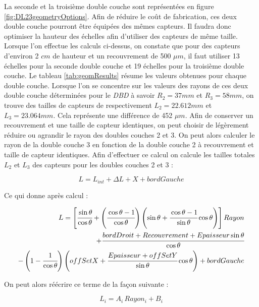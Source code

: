   \medskip
   
   La seconde et la troisi\`eme double couche sont repr\'esent\'ees en figure \ref{fig:DL23geometryOptions}. Afin de r\'eduire le co\^ut de fabrication, ces deux double couche pourront \^etre \'equip\'ees des m\^emes capteurs. Il faudra donc optimiser la hauteur des \'echelles afin d'utiliser des capteurs de m\^eme taille. Lorsque l'on effectue les calculs ci-dessus, on constate que pour des capteurs d'environ 2 $cm$ de hauteur et un recouvrement de 500 $\mu m$, il faut utiliser 13 \'echelles pour la seconde double couche et 19 \'echelles pour la troisi\`eme double couche. Le tableau \ref{tab:geomResults} r\'esume les valeurs obtenues pour chaque double couche. Lorsque l'on se concentre sur les valeurs des rayons de ces deux double couche d\'etermin\'ees pour le \textit{DBD} \`a savoir $R_2 = 37 mm$ et $R_3 = 58 mm$, on trouve des tailles de capteurs de respectivement $L_2 = 22.612 mm$ et $L_3 = 23.064 mm$. Cela repr\'esente une diff\'erence de 452 $\mu m$. Afin de conserver un recouvrement et une taille de capteur identiques, on peut choisir de l\'eg\`erement r\'eduire ou agrandir le rayon des doubles couches 2 et 3. On peut alors calculer le rayon de la double couche 3 en fonction de la double couche 2 \`a recouvrement et taille de capteur identiques. Afin d'effectuer ce calcul on calcule les tailles totales $L_2$ et $L_3$ des capteurs pour les doubles couches 2 et 3 :
  
  \begin{equation}
   L = L_{int} + \Delta L + X + bordGauche
  \end{equation}

  Ce qui donne apr\`es calcul :
  
  \begin{align}
   L = \left[ \cfrac{\sin{\theta}}{\cos{\theta}}  + \left( \cfrac{\cos{\theta} - 1}{\cos{\theta}} \right) \left( \sin{\theta} + \cfrac{\cos{\theta} - 1}{\sin{\theta}} \cos{\theta} \right) \right] Rayon \\ \nonumber
   + \cfrac{bordDroit + Recouvrement + Epaisseur \sin{\theta}}{\cos{\theta}} \\ \nonumber
   - \left( 1 - \cfrac{1}{\cos{\theta}} \right) \left( offSetX + \cfrac{Epaisseur + offSetY}{\sin{\theta}} \cos{\theta} \right) + bordGauche
  \end{align}  

  On peut alors r\'e\'ecrire ce terme de la fa\c{c}on suivante :
  
  \begin{equation}
   L_i = A_i \, Rayon_i + B_i
   \label{eq:long_sensor}
  \end{equation}

